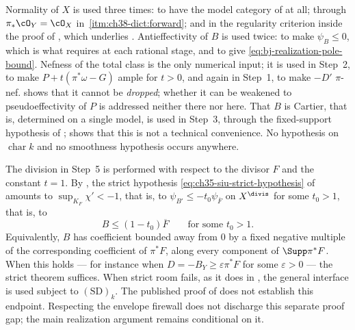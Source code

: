 \begin{remark}
\label{rem:ch38-hypothesis-map}
Normality of $X$ is used three times: to have the model category of
 at all; through $\pi_*\cO_Y=\cO_X$ in
\,\cref{itm:ch38-dict:forward}; and in
the regularity criterion inside the proof of
, which underlies
.  Antieffectivity of $B$ is used
twice: to make $\psi_B\leq0$, which is what
 requires at each rational stage, and
to give \eqref{eq:bj-realization-pole-bound}.  Nefness of the total class
is the only numerical input; it is used in Step~2, to make
$P+t(\pi^*\omega-G)$ ample for $t>0$, and again in Step~1, to make
$-D'$ $\pi$-nef.   shows that it cannot be
\emph{dropped}; whether it can be weakened to pseudoeffectivity of $P$ is
addressed neither there nor here.  That
$B$ is Cartier, that is, determined on a single model, is used in
Step~3, through the fixed-support hypothesis of
; 
shows that this is not a technical convenience.  No hypothesis on
$\operatorname{char}k$ and no smoothness hypothesis occurs anywhere.
\end{remark}

\begin{remark}
\label{rem:ch38-siu-room}
The division in Step~5 is performed with respect to the divisor $F$ and
the constant $t=1$.  By , the strict
hypothesis \eqref{eq:ch35-siu-strict-hypothesis} of
 amounts to
$\sup_{K_F}\chi'<-1$, that is, to
$\psi_{B'}\leq-t_0\psi_{\overline F}$ on $X^{\divis}$ for some
$t_0>1$, that is, to
\[
 B\leq(1-t_0)\overline F\qquad\text{for some }t_0>1 .
\]
Equivalently, $B$ has coefficient bounded away from $0$ by a fixed
negative multiple of the corresponding coefficient of $\pi^*F$, along
every component of $\Supp\pi^*F$.  When this holds --- for instance when
$D=-B_Y\geq\varepsilon\pi^*F$ for some $\varepsilon>0$ --- the strict
theorem  suffices.
When strict room fails, as it does in
, the general interface
 is used subject to
$\mathrm{(SD)}_k$. The published proof of \cite[Theorem~6.21]{BJ22}
does not establish this endpoint. Respecting the envelope firewall does
not discharge this separate proof gap; the main realization argument
remains conditional on it.
\end{remark}

